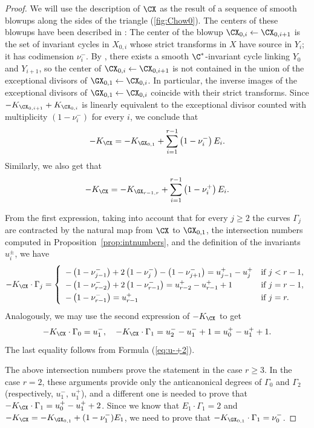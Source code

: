 \documentclass[11pt]{amsart}
\numberwithin{equation}{section}
\theoremstyle{definition}
\theoremstyle{remark}
\begin{document}
\begin{proof}
We will use  the description of $\CX$ as the result of a sequence of smooth blowups along the sides of the triangle (\ref{fig:Chow0}). The centers of these blowups have been described in \cite[Remark~5.10]{WORS6}: The center of the blowup $\CX_{0,i}\leftarrow \CX_{0,i+1}$ is the set of invariant cycles in $X_{0,i}$ whose strict transforms in $X$ have source in $Y_{i}$; it has codimension $\nu_i^-$. By \cite[Theorem 5.7]{OS2}, there exists a smooth $\C^*$-invariant cycle linking $Y_0$ and $Y_{i+1}$, so the center of $\CX_{0,i}\leftarrow \CX_{0,i+1}$ is not contained in the union of the exceptional divisors of $\GX_{0,1}\leftarrow \CX_{0,i}$. In particular, the inverse images of the exceptional divisors of $\GX_{0,1}\leftarrow \CX_{0,i}$ coincide with their strict transforms. Since  $-K_{\CX_{0,i+1}}+K_{\CX_{0,i}}$ is linearly equivalent to the exceptional divisor counted with multiplicity $(1-\nu_i^-)$ for every $i$, we conclude that    
\[
-K_{\CX}= -K_{\GX_{0,1}}+ \sum_{i=1}^{r-1}\left(1-\nu_i^-\right) E_i.
\]
Similarly, we also get that 
\[
-K_{\CX}= -K_{\GX_{r-1,r}}+ \sum_{i=1}^{r-1}\left(1-\nu_i^+\right) E_i.
\]

From the first expression, taking into account that for every $j\geq 2$ the curves $\Gamma_j$ are contracted by the natural map from $\CX$ to $\GX_{0,1}$, the intersection numbers computed in Proposition~\ref{prop:intnumbers}, and the definition of the invariants $u_i^{\pm}$, we have 
\[
-K_{\CX}\cdot \Gamma_j=
\left\{\def\arraystretch{1.3}
\begin{array}{ll}
-\left(1-\nu^-_{j-1}\right)+2\left(1-\nu^-_{j}\right)-\left(1-\nu^-_{j+1}\right)=u^+_{j-1}-u^+_{j}&\mbox{if }j<r-1,\\
-\left(1-\nu^-_{r-2}\right)+2\left(1-\nu^-_{r-1}\right)=u^+_{r-2}-u^+_{r-1}+1&\mbox{if }j=r-1,\\
-\left(1-\nu^-_{r-1}\right)=u^+_{r-1}&\mbox{if }j=r.
\end{array}
\right.
\]
Analogously, we may use the second expression of $-K_{\CX}$ to get 
\[-K_{\CX}\cdot\Gamma_0=u_1^-,\quad -K_{\CX}\cdot\Gamma_1=u^-_2-u_1^-+1=u_{0}^+ - u_1^+ +1.\]
The last equality follows from Formula (\ref{eq:u-+2}). 

The above intersection numbers prove the statement in the case $r\geq 3$. In the case $r=2$, these arguments provide only the anticanonical degrees of $\Gamma_0$ and $\Gamma_2$ (respectively, $u^-_1$, $u^+_1$), and a different one is needed to prove that $-K_{\CX}\cdot\Gamma_1=u_0^+-u_1^++2$. Since we know that $E_1\cdot\Gamma_1=2$ and $-K_{\CX}=-K_{\GX_{0,1}}+(1-\nu_1^-)E_1$, we need to prove that $-K_{\GX_{0,1}}\cdot \Gamma_1=\nu^-_0$. 


\end{proof}
\end{document}
